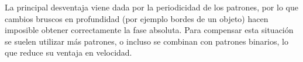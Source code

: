 La principal desventaja viene dada por la periodicidad de los patrones, por lo que cambios bruscos en profundidad (por ejemplo bordes de un objeto) hacen imposible obtener correctamente la fase absoluta. Para compensar esta situación se suelen utilizar más patrones, o incluso se combinan con patrones binarios, lo que reduce su ventaja en velocidad.










